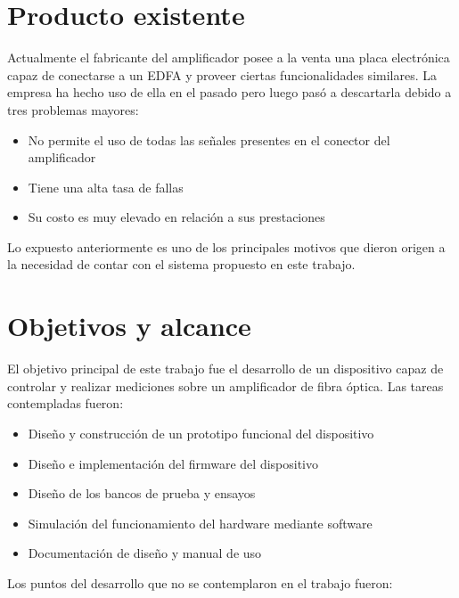 
\section{Producto existente}

Actualmente el fabricante del amplificador posee a la venta una placa electrónica capaz de conectarse a un EDFA y proveer ciertas funcionalidades similares. La empresa ha hecho uso de ella en el pasado pero luego pasó a descartarla debido a tres problemas mayores:

\begin{itemize}
\item No permite el uso de todas las señales presentes en el conector del amplificador
\item Tiene una alta tasa de fallas
\item Su costo es muy elevado en relación a sus prestaciones
\end{itemize}

Lo expuesto anteriormente es uno de los principales motivos que dieron origen a la necesidad de contar con el sistema propuesto en este trabajo.


\section{Objetivos y alcance}

El objetivo principal de este trabajo fue el desarrollo de un dispositivo capaz de controlar y realizar mediciones sobre un amplificador de fibra óptica. Las tareas contempladas fueron:

\begin{itemize}
\item Diseño y construcción de un prototipo funcional del dispositivo
\item Diseño e implementación del firmware del dispositivo
\item Diseño de los bancos de prueba y ensayos
\item Simulación del funcionamiento del hardware mediante software
\item Documentación de diseño y manual de uso
\end{itemize}

Los puntos del desarrollo que no se contemplaron en el trabajo fueron:

